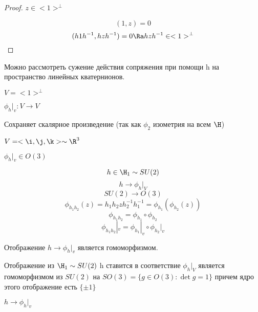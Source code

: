 \begin{proof}
$z \in <1>^{\bot}$

$$(1, z) = 0$$
$$(h1h^{-1}, hzh^{-1}) = 0 \Ra hzh^{-1} \in <1>^{\bot}$$
\end{proof}

Можно рассмотреть сужение действия сопряжения при помощи h на пространство линейных кватернионов.  

$V = <1>^{\bot}$

$\phi_h|_{v} \colon V \to V$

Сохраняет скалярное произведение (так как $\phi_2$ изометрия на всем $\H$)

$V = <\i, \j, \k> \sim \R^3$

$\phi_h|_{v} \in O(3)$

$$h \in \H_1 \sim SU(2)$$
$$h \to \phi_h|_{V}$$
$$SU(2) \to O(3)$$
$$\phi_{h_1h_2}(z) = h_1h_2zh_2^{-1}h_1^{-1} = \phi_{h_1}(\phi_{h_2}(z))$$
$$\phi_{h_1h_2} = \phi_{h_1}\circ \phi_{h_2}$$
$$\phi_{h_1h_2}|_{v} = \phi_{h_1}|_{v} \circ \phi_{h_2}|_{v} $$

Отображение $h \to \phi_h|_{v}$ является гомоморфизмом. 

\begin{theorem}
    Отображение из $\H_1 \sim SU(2)$  h ставится 
    в соответствие $\phi_h|_V$  является гомоморфизмом из
    $SU(2)$ на $SO(3) = \{g \in O(3) \colon \det g = 1\}$
    причем ядро этого отображение есть $\{\pm1\}$

    $h \to \phi_h|_{v}$
\end{theorem}

